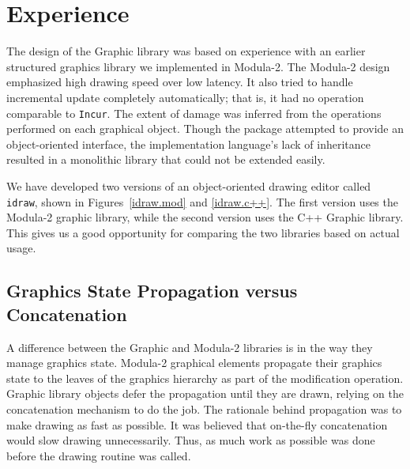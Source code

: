 \section{Experience}

The design of the Graphic library was based on experience with
an earlier structured graphics library we implemented in \mbox{Modula-2}.
The \mbox{Modula-2} design emphasized high drawing speed over low
latency.  It also tried to handle incremental update completely
automatically; that is, it had no operation comparable to {\tt Incur}.  The
extent of damage was inferred from the operations performed on each graphical
object.  Though the package attempted to provide an
object-oriented interface, the implementation language's lack of inheritance
resulted in a monolithic library that could not be extended
easily.

\begin{figure*}[p]
\vspace{3in}
\caption{The {\tt idraw} drawing editor, \mbox{Modula-2} version}
\label{idraw.mod}
\end{figure*}

\begin{figure*}
\vspace{3.5in}
\caption{The {\tt idraw} drawing editor, C++ version}
\label{idraw.c++}
\end{figure*}

We have developed two versions of an object-oriented drawing editor called
{\tt idraw}, shown in Figures~\ref{idraw.mod} and \ref{idraw.c++}.  The first
version uses the \mbox{Modula-2} graphic library, while the second version
uses the C++ Graphic library.  This gives us a good opportunity for comparing
the two libraries based on actual usage.

\subsection{Graphics State Propagation versus Concatenation}

A difference between the Graphic and \mbox{Modula-2} libraries is in
the way they manage graphics state.  Modula-2 graphical elements
propagate their graphics state to the leaves of the
graphics hierarchy as part of the modification operation.  Graphic
library
objects defer the propagation until they are drawn, relying on the
concatenation mechanism to do the job.
The rationale behind propagation was to make drawing as fast as possible.
It was believed that on-the-fly concatenation would slow drawing
unnecessarily.  Thus, as much work as possible was done before the drawing
routine was called.  

